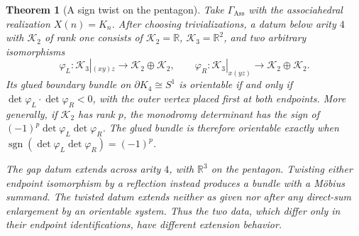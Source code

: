 \documentclass[11pt,letterpaper,twoside]{article}
\theoremstyle{plain}
\newtheorem{theorem}{Theorem}[section]
\theoremstyle{definition}
\theoremstyle{remark}
\begin{document}
\begin{theorem}[A sign twist on the pentagon]\label{thm:pentagon-twist}
Take \(\Gamma_{\mathrm{Ass}}\) with the associahedral realization \(X(n)=K_n\).  After choosing trivializations, a datum below arity \(4\) with \(\mathcal K_2\) of rank one consists of \(\mathcal K_2=\mathbb R\), \(\mathcal K_3=\mathbb R^2\), and two arbitrary isomorphisms
\[
 \varphi_L:\mathcal K_3|_{(xy)z}\to\mathcal K_2\oplus\mathcal K_2,
 \qquad
 \varphi_R:\mathcal K_3|_{x(yz)}\to\mathcal K_2\oplus\mathcal K_2.
\]
Its glued boundary bundle on \(\partial K_4\cong S^1\) is orientable if and only if \(\det\varphi_L\cdot\det\varphi_R<0\), with the outer vertex placed first at both endpoints.  More generally, if \(\mathcal K_2\) has rank \(p\), the monodromy determinant has the sign of \((-1)^p\det\varphi_L\det\varphi_R\).  The glued bundle is therefore orientable exactly when \(\operatorname{sgn}(\det\varphi_L\det\varphi_R)=(-1)^p\).

The gap datum extends across arity \(4\), with \(\mathbb R^3\) on the pentagon.  Twisting either endpoint isomorphism by a reflection instead produces a bundle with a M\"obius summand.  The twisted datum extends neither as given nor after any direct-sum enlargement by an orientable system.  Thus the two data, which differ only in their endpoint identifications, have different extension behavior.
\end{theorem}
\end{document}
